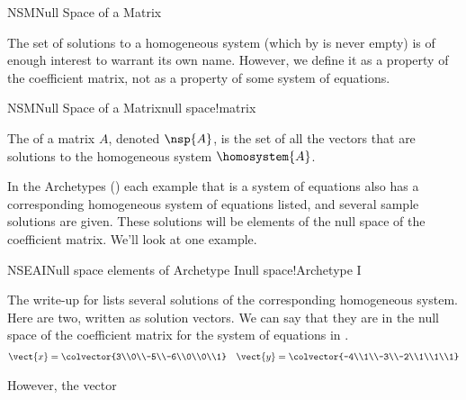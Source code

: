 %
\begin{subsect}{NSM}{Null Space of a Matrix}
%
\begin{para}The set of solutions to a homogeneous system (which by  is never empty) is of enough interest to warrant its own name.  However, we define it as a property of the coefficient matrix, not as a property of some system of equations.\end{para}
%
\begin{definition}{NSM}{Null Space of a Matrix}{null space!matrix}
\begin{para}The  of a matrix $A$, denoted $\nsp{A}$, is the set of all the vectors that are solutions to the homogeneous system $\homosystem{A}$.\end{para}
\end{definition}
%
\begin{para}In the Archetypes () each example that is a system of equations also has a corresponding homogeneous system of equations listed, and several sample solutions are given.  These solutions will be elements of the null space of the coefficient matrix.  We'll look at one example.\end{para}
%
\begin{example}{NSEAI}{Null space elements of Archetype I}{null space!Archetype I}
\begin{para}The write-up for  lists several solutions of the corresponding homogeneous system.  Here are two, written as solution vectors.  We can say that they are in the null space of the coefficient matrix for the system of equations in .
%
\begin{align*}
\vect{x}=\colvector{3\\0\\-5\\-6\\0\\0\\1}&&
\vect{y}=\colvector{-4\\1\\-3\\-2\\1\\1\\1}
\end{align*}
\end{para}
%
\begin{para}However, the vector

\end{para}
\end{example}
\end{subsect}
